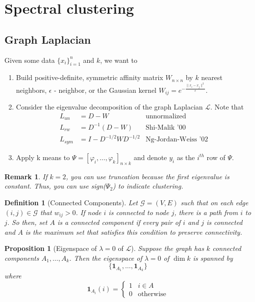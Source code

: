 \documentclass[12pt]{article}
\theoremstyle{plain}
\newtheorem*{definition}{Definition}
\newtheorem*{remark}{Remark}
\newtheorem*{proposition}{Proposition}
\begin{document}
\section{Spectral clustering}
\label{sec:spectral}

\subsection{Graph Laplacian}

Given some data $ \{ x_i \}_{i = 1}^n $ and $ k $, we want to
\begin{enumerate}
  \item Build positive-definite, symmetric affinity matrix $ W_{n \times n} $ by $ k $ nearest neighbors, $ \epsilon $ - neighbor, or the Gaussian kernel $ W_{ij} = e^{- \frac{\| x_i - x_j \|^2}{\epsilon}} $.
  \item Consider the eigenvalue decomposition of the graph Laplacian $ \mathcal{L} $.
  Note that
  \begin{align*}
    L_{un} &= D - W  & \text{unnormalized} \\
    L_{rw} &= D^{-1} (D - W) & \text{Shi-Malik '00} \\
    L_{sym} &= I - D^{-1/2} W D^{-1/2} & \text{Ng-Jordan-Weiss '02}
  \end{align*}
  \item Apply k means to $ \Psi = [\varphi_i, \ldots, \varphi_k]_{n \times k} $ and denote $ y_i $ as the $ i^{th} $ row of $ \Psi $.
\end{enumerate}

\begin{remark}
  If $ k = 2$, you can use truncation because the first eigenvalue is constant. Thus, you can use sign($\Psi_2$) to indicate clustering.
\end{remark}

\begin{definition}[Connected Components]

Let $ \mathcal{G} = (V, E) $ such that on each edge $ (i, j) \in \mathcal{G} $ that $ w_{ij} > 0 $.
If node $ i $ is connected to node $ j $, there is a path from $ i $ to $ j $.
So then, set $ A $ is a connected component if every pair of $ i $ and $ j $ is connected and $ A $ is the maximum set that satisfies this condition to preserve connectivity.

\end{definition}

\begin{proposition}[Eigenspace of $ \lambda = 0 $ of $\mathcal{L}$]

Suppose the graph has $ k $ connected components $ A_{1}, \ldots, A_{k} $.
Then the eigenspace of $ \lambda = 0 $ of $ \dim{k} $ is spanned by
\[
\{ \mathbf{1}_{A_{1}}, \ldots, \mathbf{1}_{A_{k}} \}
\]
where
\[
\mathbf{1}_{A_{i}} (i) =
\begin{cases}
  1 & i \in A \\
  0 & \text{otherwise}
\end{cases}
\]

\end{proposition}
\end{document}
